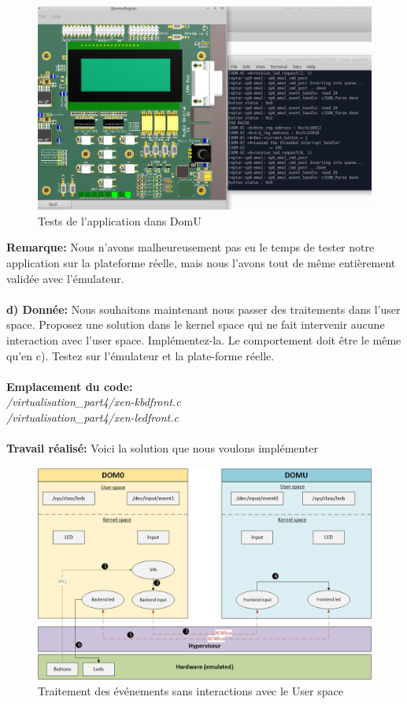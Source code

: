 \begin{figure}[H]
	\begin{center}
		\includegraphics[width=17cm]{img/dom05.png}
		\caption{Tests de l'application dans DomU}
		\label{dom05}
	\end{center}
\end{figure}
\textbf{Remarque: }Nous n'avons malheureusement pas eu le temps de tester notre application sur la plateforme réelle, mais nous l'avons tout de même entièrement validée avec l'émulateur.\\\\
\textbf{d) Donnée: }Nous souhaitons maintenant nous passer des traitements dans l’user space. Proposez une solution
dans le kernel space qui ne fait intervenir aucune interaction avec l’user space. Implémentez-la.
Le comportement doit être le même qu’en c). Testez sur l’émulateur et la plate-forme réelle.\\\\
\textbf{Emplacement du code: }\\\textit{/virtualisation\_part4/xen-kbdfront.c}\\
\textit{/virtualisation\_part4/xen-ledfront.c}\\\\
\newpage
\textbf{Travail réalisé: }Voici la solution que nous voulons implémenter
\begin{figure}[H]
	\begin{center}
		\includegraphics[width=17cm]{img/virt5.png}
		\caption{Traitement des événements sans interactions avec le User space}
		\label{virt5}
	\end{center}
\end{figure}
